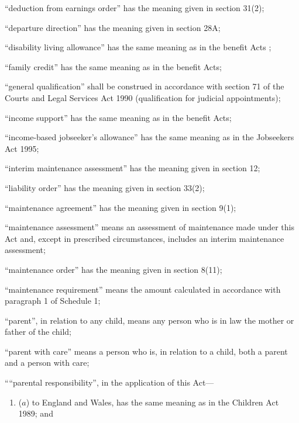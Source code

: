 \documentclass[12pt,a4paper]{article}
\begin{document}
\begin{enumerate}
    “deduction from earnings order” has the meaning given in section 31(2);

“departure direction” has the meaning given in section 28A;

    “disability living allowance” has the same meaning as in the 
benefit Acts%
;

    “family credit” has the same meaning as in the benefit Acts;

    “general qualification” shall be construed in accordance with section 71 of the Courts and Legal Services Act 1990 (qualification for judicial appointments);

    “income support” has the same meaning as in the benefit Acts;

“income-based jobseeker’s allowance” has the same meaning as in the Jobseekers Act 1995;

    “interim maintenance assessment” has the meaning given in section 12;

    “liability order” has the meaning given in section 33(2);

    “maintenance agreement” has the meaning given in section 9(1);

    “maintenance assessment” means an assessment of maintenance made under this Act and, except in prescribed circumstances, includes an interim maintenance assessment;

    “maintenance order” has the meaning given in section 8(11);

    “maintenance requirement” means the amount calculated in accordance with paragraph 1 of Schedule 1;

    “parent”, in relation to any child, means any person who is in law the mother or father of the child;

“parent with care” means a person who is, in relation to a child, both a parent and a person with care;


““parental responsibility”, in the application of this Act—
\begin{enumerate}\item[]
($a$) to England and Wales, has the same meaning as in the Children Act 1989; and


\end{enumerate}
\end{enumerate}
\end{document}

